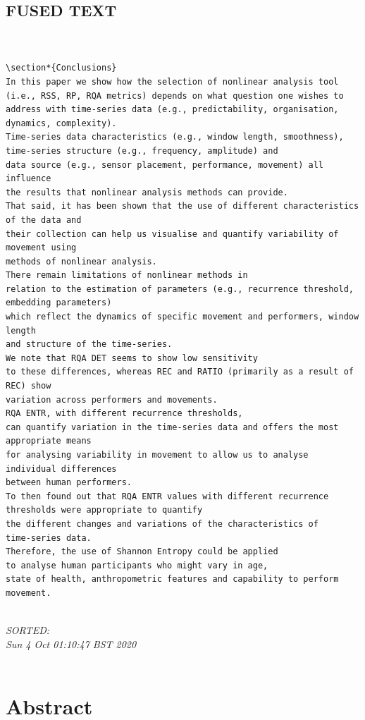 \documentclass[10pt]{article}
\begin{document}
\subsection{FUSED TEXT}
\begin{verbatim}


\section*{Conclusions}
In this paper we show how the selection of nonlinear analysis tool  
(i.e., RSS, RP, RQA metrics) depends on what question one wishes to 
address with time-series data (e.g., predictability, organisation, dynamics, complexity).  
Time-series data characteristics (e.g., window length, smoothness), 
time-series structure (e.g., frequency, amplitude) and 
data source (e.g., sensor placement, performance, movement) all influence 
the results that nonlinear analysis methods can provide.
That said, it has been shown that the use of different characteristics of the data and 
their collection can help us visualise and quantify variability of movement using 
methods of nonlinear analysis.   
There remain limitations of nonlinear methods in 
relation to the estimation of parameters (e.g., recurrence threshold, embedding parameters) 
which reflect the dynamics of specific movement and performers, window length 
and structure of the time-series. 
We note that RQA DET seems to show low sensitivity 
to these differences, whereas REC and RATIO (primarily as a result of REC) show 
variation across performers and movements.   
RQA ENTR, with different recurrence thresholds, 
can quantify variation in the time-series data and offers the most appropriate means 
for analysing variability in movement to allow us to analyse individual differences 
between human performers.  
To then found out that RQA ENTR values with different recurrence 
thresholds were appropriate to quantify 
the different changes and variations of the characteristics of 
time-series data.
Therefore, the use of Shannon Entropy could be applied 
to analyse human participants who might vary in age, 
state of health, anthropometric features and capability to perform movement.


\end{verbatim}

\textit{
SORTED: \\ 
Sun  4 Oct 01:10:47 BST 2020 \\
}
\\


\section{Abstract}
\end{document}
